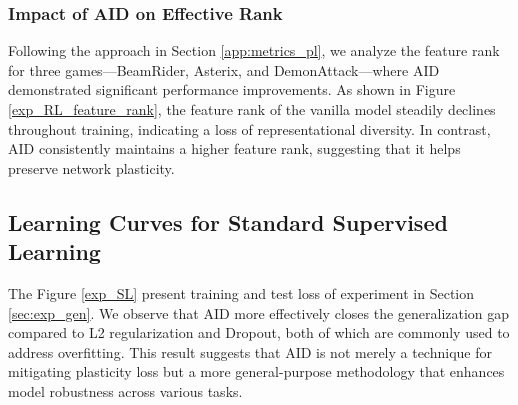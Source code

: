 \newpage
\subsubsection{Impact of AID on Effective Rank}


Following the approach in Section \ref{app:metrics_pl}, we analyze the feature rank for three games—BeamRider, Asterix, and DemonAttack—where AID demonstrated significant performance improvements. 
As shown in Figure \ref{exp_RL_feature_rank}, the feature rank of the vanilla model steadily declines throughout training, indicating a loss of representational diversity. In contrast, AID consistently maintains a higher feature rank, suggesting that it helps preserve network plasticity.



\subsection{Learning Curves for Standard Supervised Learning}
\label{app:learning_curve_sl}


The Figure \ref{exp_SL} present training and test loss of experiment in Section \ref{sec:exp_gen}. We observe that AID more effectively closes the generalization gap compared to L2 regularization and Dropout, both of which are commonly used to address overfitting. This result suggests that AID is not merely a technique for mitigating plasticity loss but a more general-purpose methodology that enhances model robustness across various tasks.
